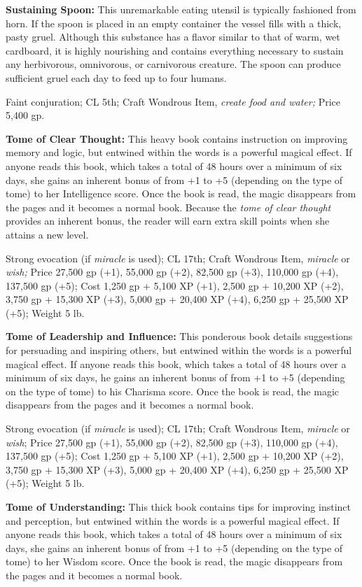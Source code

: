 \textbf{Sustaining Spoon:} This unremarkable eating utensil is typically fashioned 
from horn. If the spoon is placed in an empty container the vessel fills with a 
thick, pasty gruel. Although this substance has a flavor similar to that of warm, 
wet cardboard, it is highly nourishing and contains everything necessary to sustain 
any herbivorous, omnivorous, or carnivorous creature. The spoon can produce sufficient 
gruel each day to feed up to four humans.

Faint conjuration; CL 5th; Craft Wondrous Item, \textit{create food and water; 
}Price 5,400 gp.

\textbf{Tome of Clear Thought:} This heavy book contains instruction on improving 
memory and logic, but entwined within the words is a powerful magical effect. If 
anyone reads this book, which takes a total of 48 hours over a minimum of six days, 
she gains an inherent bonus of from +1 to +5 (depending on the type of tome) to 
her Intelligence score. Once the book is read, the magic disappears from the pages 
and it becomes a normal book. Because the \textit{tome of clear thought }provides 
an inherent bonus, the reader will earn extra skill points when she attains a new 
level.

Strong evocation (if \textit{miracle }is used); CL 17th; Craft Wondrous Item, \textit{miracle 
}or \textit{wish; }Price 27,500 gp (+1), 55,000 gp (+2), 82,500 gp (+3), 110,000 
gp (+4), 137,500 gp (+5); Cost 1,250 gp + 5,100 XP (+1), 2,500 gp + 10,200 XP (+2), 
3,750 gp + 15,300 XP (+3), 5,000 gp + 20,400 XP (+4), 6,250 gp + 25,500 XP (+5); 
Weight 5 lb.

\textbf{Tome of Leadership and Influence:} This ponderous book details suggestions 
for persuading and inspiring others, but entwined within the words is a powerful 
magical effect. If anyone reads this book, which takes a total of 48 hours over 
a minimum of six days, he gains an inherent bonus of from +1 to +5 (depending on 
the type of tome) to his Charisma score. Once the book is read, the magic disappears 
from the pages and it becomes a normal book.

Strong evocation (if \textit{miracle }is used); CL 17th; Craft Wondrous Item, \textit{miracle 
}or \textit{wish}; Price 27,500 gp (+1), 55,000 gp (+2), 82,500 gp (+3), 110,000 
gp (+4), 137,500 gp (+5); Cost 1,250 gp + 5,100 XP (+1), 2,500 gp + 10,200 XP (+2), 
3,750 gp + 15,300 XP (+3), 5,000 gp + 20,400 XP (+4), 6,250 gp + 25,500 XP (+5); 
Weight 5 lb.

\textbf{Tome of Understanding:} This thick book contains tips for improving instinct 
and perception, but entwined within the words is a powerful magical effect. If 
anyone reads this book, which takes a total of 48 hours over a minimum of six days, 
she gains an inherent bonus of from +1 to +5 (depending on the type of tome) to 
her Wisdom score. Once the book is read, the magic disappears from the pages and 
it becomes a normal book.

